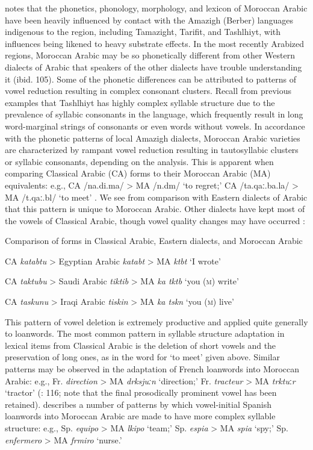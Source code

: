   \citet{Chtatou1997} notes that the phonetics, phonology, morphology, and lexicon of Moroccan Arabic have been heavily influenced by contact with the Amazigh (Berber) languages indigenous to the region, including Tamazight, Tarifit, and Tashlhiyt, with influences being likened to heavy substrate effects. In the most recently Arabized regions, Moroccan Arabic may be so phonetically different from other Western dialects of Arabic that speakers of the other dialects have trouble understanding it (ibid. 105). Some of the phonetic differences can be attributed to patterns of vowel reduction resulting in complex consonant clusters. Recall from previous examples that Tashlhiyt has highly complex syllable structure due to the prevalence of syllabic consonants in the language, which frequently result in long word-marginal strings of consonants or even words without vowels. In accordance with the phonetic patterns of local Amazigh dialects, Moroccan Arabic varieties are characterized by rampant vowel reduction resulting in tautosyllabic clusters or syllabic consonants, depending on the analysis. This is apparent when comparing Classical Arabic (CA) forms to their Moroccan Arabic (MA) equivalents: e.g., CA /na.di.ma/ > MA /n.dm/ ‘to regret;’ CA /ta.qaː.ba.la/ > MA /t.qaː.bl/ ‘to meet’ \citep[110]{Chtatou1997}. We see from comparison with Eastern dialects of Arabic that this pattern is unique to Moroccan Arabic. Other dialects have kept most of the vowels of Classical Arabic, though vowel quality changes may have occurred :

\ea\label{ex:8.5}
  Comparison of forms in Classical Arabic, Eastern dialects, and Moroccan Arabic

  CA \textit{katabtu} > Egyptian Arabic \textit{katabt} > MA \textit{ktbt} ‘I wrote’ 

  CA \textit{taktubu} > Saudi Arabic \textit{tiktib} > MA \textit{ka tktb} ‘you (\textsc{m}) write’

  CA \textit{taskunu} > Iraqi Arabic \textit{tiskin} > MA \textit{ka tskn} ‘you (\textsc{m}) live’
\citep[111-12]{Chtatou1997}
\z

This pattern of vowel deletion is extremely productive and applied quite generally to loanwords. The most common pattern in syllable structure adaptation in lexical items from Classical Arabic is the deletion of short vowels and the preservation of long ones, as in the word for ‘to meet’ given above. Similar patterns may be observed in the adaptation of French loanwords into Moroccan Arabic: e.g., Fr. \textit{direction} > MA \textit{drksjuːn} ‘direction;’ Fr. \textit{tracteur} > MA \textit{trktu}ː\textit{r} ‘tractor’ (\citealt{Chatou1997}: 116; note that the final prosodically prominent vowel has been retained). \citet{Sayahi2005} describes a number of patterns by which vowel-initial Spanish loanwords into Moroccan Arabic are made to have more complex syllable structure: e.g., Sp. \textit{equipo} > MA \textit{lkipo} ‘team;’ Sp. \textit{espia} > MA \textit{spia} ‘spy;’ Sp. \textit{enfermero} > MA \textit{frmiro} ‘nurse.’


